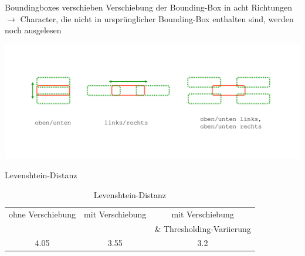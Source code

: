 \begin{frame}{Boundingboxes verschieben}
Verschiebung der Bounding-Box in acht Richtungen $\rightarrow$ Character, die nicht in ursprünglicher Bounding-Box enthalten sind, werden noch ausgelesen
    \begin{center}
        \includegraphics[width=\textwidth]{img/bbox_shift}
    \end{center}
\end{frame}

\begin{frame}{Levenshtein-Distanz}
    \begin{table}[H]
        \centering
        \caption{Levenshtein-Distanz}
        \begin{tabular}{ccc}
            ohne Verschiebung & mit Verschiebung & mit Verschiebung           \\
                              &                  & \& Thresholding-Variierung \\
            4.05              & 3.55             & 3.2
        \end{tabular}
    \end{table}
\end{frame}

